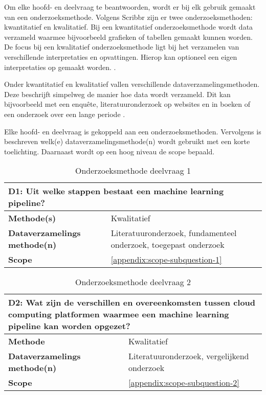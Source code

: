 
\renewcommand{\arraystretch}{1.35} %

Om elke hoofd- en deelvraag te beantwoorden, wordt er bij elk gebruik gemaakt van een onderzoeksmethode. Volgens Scribbr \cite{research-methods} zijn er twee onderzoeksmethoden: kwantitatief en kwalitatief. Bij een kwantitatief onderzoeksmethode wordt data verzameld waarmee bijvoorbeeld grafieken of tabellen gemaakt kunnen worden. De focus bij een kwalitatief onderzoeksmethode ligt bij het verzamelen van verschillende interpretaties en opvattingen. Hierop kan optioneel een eigen interpretaties op gemaakt worden. \cite{quantitative-vs-qualitative}.

Onder kwantitatief en kwalitatief vallen verschillende dataverzamelingsmethoden. Deze beschrijft simpelweg de manier hoe data wordt verzameld. Dit kan bijvoorbeeld met een enquête, literatuuronderzoek op websites en in boeken of een onderzoek over een lange periode \cite{quantitative-vs-qualitative}.

Elke hoofd- en deelvraag is gekoppeld aan een onderzoeksmethoden. Vervolgens is beschreven welk(e) dataverzamelingsmethode(n) wordt gebruikt met een korte toelichting. Daarnaast wordt op een hoog niveau de scope bepaald.

\begin{table}[hbt!]
  \centering
  \begin{tabular}{|p{.215\linewidth}|p{.72\linewidth}|}
  \hline
  \multicolumn{2}{|p{.97\linewidth}|}{\textbf{D1: Uit welke stappen bestaat een machine learning pipeline?}} \\ \hline
    \textbf{Methode(s)}&
      Kwalitatief
    \\ \hline
    \textbf{Dataverzamelings methode(n)}&
      Literatuuronderzoek, fundamenteel onderzoek, toegepast onderzoek
    \\ \hline
    \textbf{Scope}&
      \autoref{appendix:scope-subquestion-1}
    \\ \hline
  \end{tabular}
  \caption{Onderzoeksmethode deelvraag 1}
  \label{table:research-method-subquestion-1}
\end{table}

\begin{table}[hbt!]
  \centering
  \begin{tabular}{|p{.215\linewidth}|p{.72\linewidth}|}
  \hline
  \multicolumn{2}{|p{.97\linewidth}|}{\textbf{D2: Wat zijn de verschillen en overeenkomsten tussen cloud computing platformen waarmee een machine learning pipeline kan worden opgezet?}} \\ \hline
    \textbf{Methode}&
      Kwalitatief
    \\ \hline
    \textbf{Dataverzamelings methode(n)}&
      Literatuuronderzoek, vergelijkend onderzoek
    \\ \hline
    \textbf{Scope}&
      \autoref{appendix:scope-subquestion-2}
    \\ \hline
  \end{tabular}
  \caption{Onderzoeksmethode deelvraag 2}
  \label{table:sq2}
\end{table}

